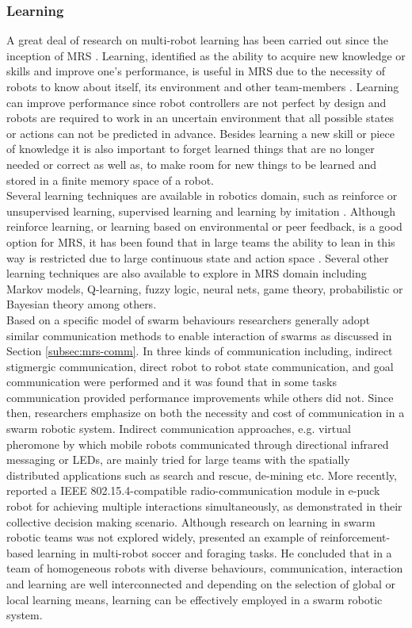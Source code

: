 \subsubsection*{Learning}
A great deal of research on multi-robot learning has been carried out since the inception of MRS \cite{Mataric+2001,Yang+2004,Parker1995}. Learning, identified as the ability to acquire new knowledge or skills and improve one's performance, is useful in MRS due to the necessity of robots to know about itself, its environment and other team-members \cite{Mataric2007}. Learning can improve performance since robot controllers are not perfect by design and robots are required to work in an uncertain environment that all possible states or actions can not be predicted in advance. Besides learning a new skill or piece of knowledge it is also important to forget learned things that are no longer needed or correct as well as, to make room for new things to be learned and stored in a finite memory space of a robot. \\
Several learning techniques are available in robotics domain, such as reinforce or unsupervised learning, supervised learning and learning by imitation \cite{Mataric2007}. Although reinforce learning, or learning based on environmental or peer feedback, is a good option for MRS, it has been found that in large teams the ability to lean in this way is restricted due to large continuous state and action space \cite{Yang+2004}. Several other learning techniques are also available to explore in MRS domain including Markov models, Q-learning, fuzzy logic, neural nets, game theory, probabilistic or Bayesian theory among others. \\
Based on a specific model of swarm behaviours researchers generally adopt similar communication methods to enable interaction of swarms as discussed in Section \ref{subsec:mrs-comm}. In \cite{Balch2005} three kinds of communication including, indirect stigmergic communication, direct robot to robot state communication, and goal communication were performed and it was found that in some tasks communication provided performance improvements while others did not. Since then, researchers emphasize on both the necessity and cost of communication in a swarm robotic system. Indirect communication approaches, e.g. virtual pheromone \cite{Payton+2005,Hamann+2006} by which mobile robots communicated through directional infrared messaging or LEDs, are mainly tried for large teams with the spatially distributed applications such as search and rescue, de-mining etc. More recently, \cite{Cianci2007} reported a IEEE 802.15.4-compatible radio-communication module in e-puck robot for achieving multiple interactions simultaneously, as demonstrated in their collective decision making scenario. 
Although research on learning in swarm robotic teams was not explored widely, \cite{Balch2005} presented an example of reinforcement-based learning in multi-robot soccer and foraging tasks. He concluded that in a team of homogeneous robots with diverse behaviours, communication, interaction and learning are well interconnected and depending on the selection of global or local learning means, learning can be effectively employed in a swarm robotic system.
%
